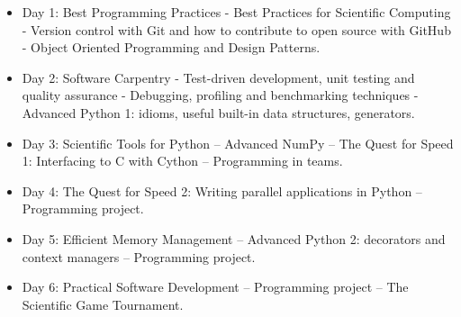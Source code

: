 \documentclass{article}[11pt]
\begin{document}
\begin{itemize}
\item Day 1: Best Programming Practices - Best Practices for Scientific
Computing - Version control with Git and how to contribute to open source with
GitHub - Object Oriented Programming and Design Patterns.

\item Day 2: Software Carpentry - Test-driven development, unit testing and
quality assurance - Debugging, profiling and benchmarking techniques -
Advanced Python 1: idioms, useful built-in data structures, generators.

\item Day 3: Scientific Tools for Python – Advanced NumPy – The Quest for
Speed 1: Interfacing to C with Cython – Programming in teams.

\item Day 4: The Quest for Speed 2: Writing parallel applications in Python  –
Programming project.

\item Day 5: Efficient Memory Management – Advanced Python 2: decorators and
context managers – Programming project.

\item Day 6: Practical Software Development – Programming project – The
Scientific Game Tournament.
\end{itemize}

\end{document}
